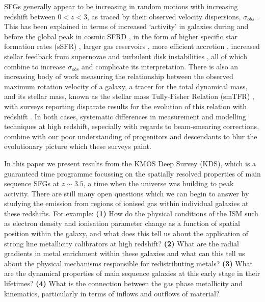 \documentclass[fleqn,usenatbib]{mn2e}
\begin{document}
SFGs generally appear to be increasing in random motions with increasing redshift between $0 < z < 3$, as traced by their observed velocity dispersions, $\sigma_{obs}$ \citep{Genzel2008,ForsterSchreiber2009,Law2009,Cresci2009,Gnerucci2011,Epinat2012,Kassin2012,Green2014,Wisnioski2015,Stott2016}.
This has been explained in terms of increased `activity' in galaxies during and before the global peak in cosmic SFRD \citep{Madau_2014}, in the form of higher specific star formation rates (sSFR) \citep{Wisnioski2015}, larger gas reservoirs \citep{Law2009,ForsterSchreiber2009,Wisnioski2015,Stott2016}, more efficient accretion \citep{Law2009}, increased stellar feedback from supernovae \citep{Kassin2012} and turbulent disk instabilities \citep{Law2009,Bournaud2007,Bournaud2016}, all of which combine to increase $\sigma_{obs}$ and complicate its interpretation.
There is also an increasing body of work measuring the relationship between the observed maximum rotation velocity of a galaxy, a tracer for the total dynamical mass, and its stellar mass, known as the stellar mass Tully-Fisher Relation (smTFR) \citep{Tully1977}, with surveys reporting disparate results for the evolution of this relation with redshift \citep[e.g.][]{Puech2008,Miller2011,Gnerucci2011,Swinbank2012,Tiley2016a,Harrison2017}.
In both cases, systematic differences in measurement and modelling techniques at high redshift, especially with regards to beam-smearing corrections, combine with our poor understanding of progenitors and descendants to blur the evolutionary picture which these surveys paint.

In this paper we present results from the KMOS Deep Survey (KDS), which is a guaranteed time programme focussing on the spatially resolved properties of main sequence SFGs at $z\sim3.5$, a time when the universe was building to peak activity.
There are still many open questions which we can begin to answer by studying the emission from regions of ionised gas within individual galaxies at these redshifts.
For example: \textbf{(1)} How do the physical conditions of the ISM such as electron density and ionisation parameter change as a function of spatial position within the galaxy, and what does this tell us about the application of strong line metallicity calibrators at high redshift?
\textbf{(2)} What are the radial gradients in metal enrichment within these galaxies and what can this tell us about the physical mechanisms responsible for redistributing metals?
\textbf{(3)} What are the dynamical properties of main sequence galaxies at this early stage in their lifetimes? 
\textbf{(4)} What is the connection between the gas phase metallicity and  kinematics, particularly in terms of inflows and outflows of material?
\end{document}
